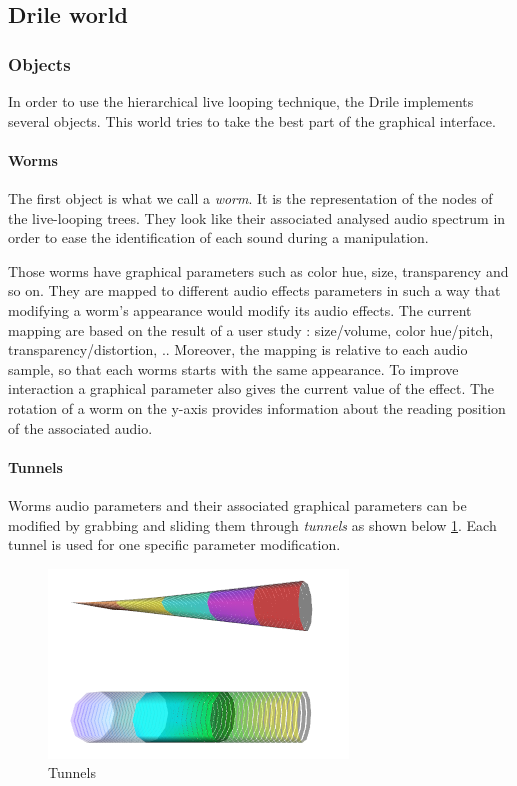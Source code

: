 \subsection{Drile world} 
 \subsubsection{Objects}
 In order to use the hierarchical live looping technique, the Drile implements several objects. This world tries to take the best part of the graphical interface.
\paragraph{Worms}    
 The first object is what we call a \textit{worm}. It is the representation of the nodes of the live-looping trees. They look like their associated analysed audio spectrum in order to ease the identification of each sound during a manipulation.
  
Those worms have graphical parameters such as color hue, size, transparency and so on. They are mapped to different audio effects parameters in such a way that modifying a worm's appearance would modify its audio effects. The current mapping are based on the result of a user study : size/volume, color hue/pitch, transparency/distortion, .. Moreover, the mapping is relative to each audio sample, so that each worms starts with the same appearance. To improve interaction a graphical parameter also gives the current value of the effect. The rotation of a worm on the y-axis provides information about the reading position of the associated audio.

\paragraph{Tunnels}    
Worms audio parameters and their associated graphical parameters can be modified by grabbing and sliding them through \textit{tunnels} as shown below \ref{fig:tunnel}. Each tunnel is used for one specific parameter modification.

\begin{figure}[h!]
\centering\includegraphics[scale=0.3]{image/tunnels.png}
\caption{Tunnels}
\label{fig:tunnel}
\end{figure} 

